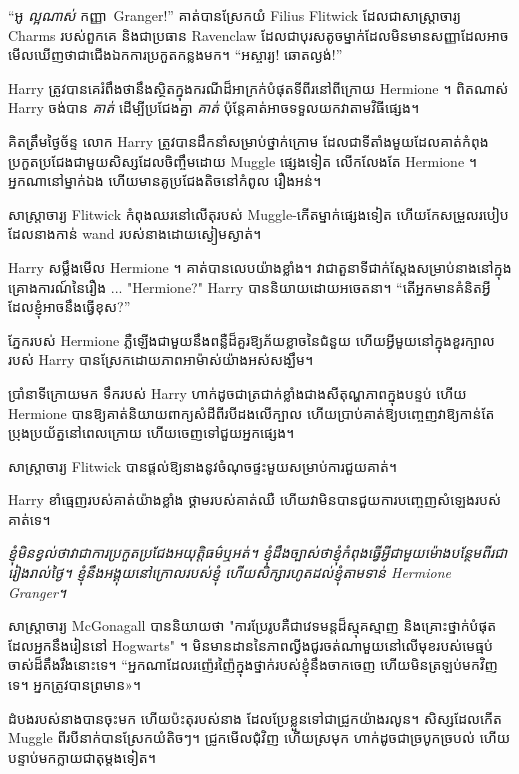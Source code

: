 “អូ \emph{ល្អណាស់} កញ្ញា~Granger!” គាត់បានស្រែកយំ Filius Flitwick ដែលជាសាស្ត្រាចារ្យ Charms របស់ពួកគេ និងជាប្រធាន Ravenclaw ដែលជាបុរសតូចម្នាក់ដែលមិនមានសញ្ញាដែលអាចមើលឃើញថាជាជើងឯកការប្រកួតកន្លងមក។ “អស្ចារ្យ! ឆោតល្ងង់!”

Harry ត្រូវបានគេរំពឹងថានឹងស្ថិតក្នុងករណីដ៏អាក្រក់បំផុតទីពីរនៅពីក្រោយ Hermione ។ ពិតណាស់ Harry ចង់បាន \emph{គាត់} ដើម្បីប្រជែងគ្នា \emph{គាត់} ប៉ុន្តែគាត់អាចទទួលយកវាតាមវិធីផ្សេង។

គិតត្រឹមថ្ងៃច័ន្ទ លោក Harry ត្រូវបានដឹកនាំសម្រាប់ថ្នាក់ក្រោម ដែលជាទីតាំងមួយដែលគាត់កំពុងប្រកួតប្រជែងជាមួយសិស្សដែលចិញ្ចឹមដោយ Muggle ផ្សេងទៀត លើកលែងតែ Hermione ។ អ្នកណានៅម្នាក់ឯង ហើយមានគូប្រជែងតិចនៅកំពូល រឿងអន់។

សាស្ត្រាចារ្យ Flitwick កំពុងឈរនៅលើតុរបស់ Muggle-កើតម្នាក់ផ្សេងទៀត ហើយកែសម្រួលរបៀបដែលនាងកាន់ wand របស់នាងដោយស្ងៀមស្ងាត់។

Harry សម្លឹងមើល Hermione ។ គាត់បានលេបយ៉ាងខ្លាំង។ វាជាតួនាទីជាក់ស្តែងសម្រាប់នាងនៅក្នុងគ្រោងការណ៍នៃរឿង ... "Hermione?" Harry បាននិយាយដោយអចេតនា។ “តើ​អ្នក​មាន​គំនិត​អ្វី​ដែល​ខ្ញុំ​អាច​នឹង​ធ្វើ​ខុស?”

ភ្នែករបស់ Hermione ភ្លឺឡើងជាមួយនឹងពន្លឺដ៏គួរឱ្យភ័យខ្លាចនៃជំនួយ ហើយអ្វីមួយនៅក្នុងខួរក្បាលរបស់ Harry បានស្រែកដោយភាពអាម៉ាស់យ៉ាងអស់សង្ឃឹម។

ប្រាំនាទីក្រោយមក ទឹករបស់ Harry ហាក់ដូចជាត្រជាក់ខ្លាំងជាងសីតុណ្ហភាពក្នុងបន្ទប់ ហើយ Hermione បានឱ្យគាត់និយាយពាក្យសំដីពីរបីដងលើក្បាល ហើយប្រាប់គាត់ឱ្យបញ្ចេញវាឱ្យកាន់តែប្រុងប្រយ័ត្ននៅពេលក្រោយ ហើយចេញទៅជួយអ្នកផ្សេង។

សាស្រ្តាចារ្យ Flitwick បានផ្តល់ឱ្យនាងនូវចំណុចផ្ទះមួយសម្រាប់ការជួយគាត់។

Harry ខាំធ្មេញរបស់គាត់យ៉ាងខ្លាំង ថ្គាមរបស់គាត់ឈឺ ហើយវាមិនបានជួយការបញ្ចេញសំឡេងរបស់គាត់ទេ។

\emph{ ខ្ញុំ​មិន​ខ្វល់​ថា​វា​ជា​ការ​ប្រកួត​ប្រជែង​អយុត្តិធម៌​ឬ​អត់។ ខ្ញុំដឹងច្បាស់ថាខ្ញុំកំពុងធ្វើអ្វីជាមួយម៉ោងបន្ថែមពីរជារៀងរាល់ថ្ងៃ។ ខ្ញុំ​នឹង​អង្គុយ​នៅ​ក្រោល​របស់ខ្ញុំ ហើយ​សិក្សា​រហូត​ដល់​ខ្ញុំ​តាម​ទាន់ Hermione Granger។}

\later

សាស្ត្រាចារ្យ McGonagall បាននិយាយថា "ការប្រែរូបគឺជាវេទមន្តដ៏ស្មុគស្មាញ និងគ្រោះថ្នាក់បំផុតដែលអ្នកនឹងរៀននៅ Hogwarts" ។ មិនមានដាននៃភាពល្វីងជូរចត់ណាមួយនៅលើមុខរបស់មេធ្មប់ចាស់ដ៏តឹងរឹងនោះទេ។ “អ្នក​ណា​ដែល​រញ៉េរញ៉ៃ​ក្នុង​ថ្នាក់​របស់​ខ្ញុំ​នឹង​ចាកចេញ ហើយ​មិន​ត្រឡប់​មក​វិញ​ទេ។ អ្នក​ត្រូវ​បាន​ព្រមាន»។

ដំបងរបស់នាងបានចុះមក ហើយប៉ះតុរបស់នាង ដែលប្រែខ្លួនទៅជាជ្រូកយ៉ាងរលូន។ សិស្សដែលកើត Muggle ពីរបីនាក់បានស្រែកយំតិចៗ។ ជ្រូកមើលជុំវិញ ហើយស្រមុក ហាក់ដូចជាច្របូកច្របល់ ហើយបន្ទាប់មកក្លាយជាតុម្តងទៀត។

